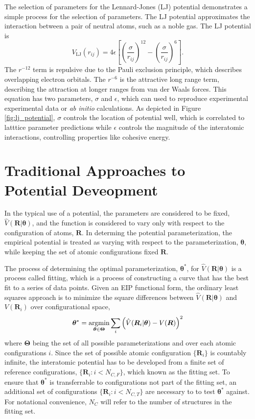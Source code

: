 The selection of parameters for the Lennard-Jones (LJ)\cite{lennardjones1924_lj_pot} potential demonstrates a simple process for the selection of parameters. The LJ potential approximates the interaction between a pair of neutral atoms, such as a noble gas.  The LJ potential is
\begin{equation}
	V_{\text{LJ}}(r_{ij}) = 4 \epsilon
    \left[
	\left(\frac{\sigma}{r_{ij}}\right)^{12}
	- \left(\frac{\sigma}{r_{ij}}\right)^{6}
    \right].
\end{equation}
The $r^{-12}$ term is repulsive due to the Pauli exclusion principle, which describes overlapping electron orbitals.  The $r^{-6}$ is the attractive long range term, describing the attraction at longer ranges from van der Waals forces.  This equation has two parameters, $\sigma$ and $\epsilon$, which can used to reproduce experimental experimental data or \emph{ab initio} calculations.  As depicted in Figure \ref{fig:lj_potential}, $\sigma$ controls the location of potential well, which is correlated to latttice parameter predictions while $\epsilon$ controls the magnitude of the interatomic interactions, controlling properties like cohesive energy.


\section{Traditional Approaches to Potential Deveopment}

In the typical use of a potential, the parameters are considered to be fixed, $\hat{V}(\bm{R}|\bm{\theta})$, and the function is considered to vary only with respect to the configuration of atoms, $\bm{R}$.  In determing the potential parameterization, the empirical potential is treated as varying with respect to the parameterization, $\bm{\theta}$, while keeping the set of atomic configurations fixed $\bm{R}$.

The process of determining the optimal parameterization, $\bm{\theta}^*$, for $\hat{V}(\bm{R}|\bm{\theta})$ is a process called fitting, which is a process of constructing a curve that has the best fit to a series of data points.  Given an EIP functional form,  the ordinary least squares approach is to minimize the square differences between $\hat{V}(\bm{R}|\bm{\theta})$ and $V(\bm{R}_i)$ over configurational space,
\begin{equation}
\label{eq:energy_matching}
	\bm{\theta}^*
		= \argmin_{\bm{\theta}\in\bm{\Theta}}
					\sum_i \left(\hat{V}(\bm{R}_i|\bm{\theta}) - V(\bm{R})\right)^2
\end{equation}
where $\bm{\Theta}$ being the set of all possible parameterizations and over each atomic configurations $i$.  Since the set of possible atomic configuration $\{\bm{R}_i\}$ is countably infinite, the interatomic potential has to be developed from a finite set of reference configurations, $\{\bm{R}_i:i<N_{C,F}\}$, which known as the fitting set.  To ensure that $\bm{\theta}^*$ is transferrable to configurations not part of the fitting set, an additional set of configurations $\{\bm{R}_i:i<N_{C,T}\}$ are necessary to  to test $\bm{\theta}^*$ against. For notational convenience, $N_C$ will refer to the number of structures in the fitting set.

